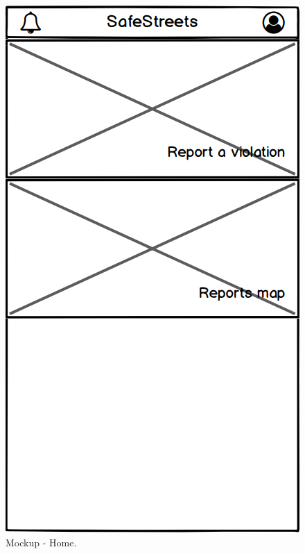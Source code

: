 \begin{figure}[H]
\centering
\begin{minipage}{.4\textwidth}
    \centering
    \includegraphics[width=.8\textwidth]{Images/home.png}
    \caption{\label{fig:mockup-home}Mockup - Home.}
\end{minipage}
\begin{minipage}{.4\textwidth}
    \centering

\end{minipage}
\end{figure}

